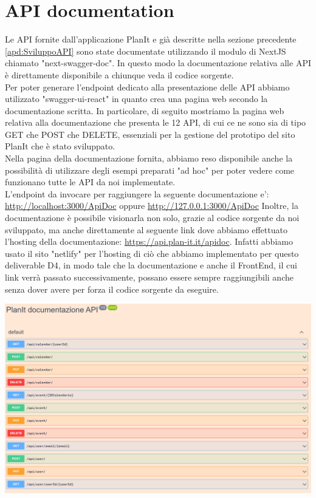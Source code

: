 \section{API documentation}
\label{secD4:APIDocumentation}
Le API fornite dall’applicazione PlanIt e già descritte nella sezione precedente \ref{apd:SviluppoAPI} sono
state documentate utilizzando il modulo di NextJS chiamato "next-swagger-doc". In questo
modo la documentazione relativa alle API è direttamente disponibile a chiunque veda il codice
sorgente.\\
Per poter generare l’endpoint dedicato alla presentazione delle API abbiamo utilizzato "swagger-ui-react" in quanto crea una pagina web secondo la documentazione scritta.
In particolare, di seguito mostriamo la pagina web relativa alla documentazione che presenta le 12 API, di cui ce ne sono sia di tipo GET che POST che DELETE, essenziali per la gestione del prototipo del sito PlanIt che è stato sviluppato.\\
Nella pagina della documentazione fornita, abbiamo reso disponibile anche la possibilità di utilizzare degli esempi preparati "ad hoc" per poter vedere come funzionano tutte le API da noi implementate. \\
L’endpoint da invocare per raggiungere la seguente documentazione e’:
\href{http://localhost:3000/ApiDoc}{http://localhost:3000/ApiDoc} oppure \href{http://127.0.0.1:3000/ApiDoc}{http://127.0.0.1:3000/ApiDoc}
Inoltre, la documentazione è possibile visionarla non solo, grazie al codice sorgente da noi sviluppato, ma anche direttamente al seguente link dove abbiamo effettuato l'hosting della documentazione: \href{https://api.plan-it.it/apidoc}{https://api.plan-it.it/apidoc}. Infatti abbiamo usato il sito "netlify" per l'hosting di ciò che abbiamo implementato per questo deliverable D4, in modo tale che la documentazione e anche il FrontEnd, il cui link verrà passato successivamente, possano essere sempre raggiungibili anche senza dover avere per forza il codice sorgente da eseguire.
\begin{center}
    \includegraphics[width=1\textwidth, height=0.4\textheight]{img/png/documentazione.png}
\end{center}